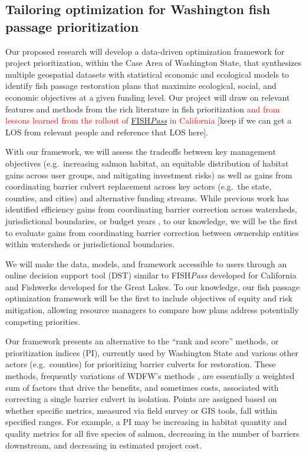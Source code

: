 \documentclass[12pt]{elsarticle}
\begin{document}
\subsection*{Tailoring optimization for Washington fish passage prioritization}

Our proposed research will develop a data-driven optimization framework for project prioritization, within the Case Area of Washington State, that synthesizes multiple geospatial datasets with statistical economic and ecological models to identify fish passage restoration plans that maximize ecological, social, and economic objectives at a given funding level. Our project will draw on relevant features and methods from the rich literature in fish prioritization \textcolor{red}{and from lessons learned from the rollout of \href{https://fishpass.psmfc.org}{FISH\emph{Pass}} in California} [keep if we can get a LOS from relevant people and reference that LOS here].


With our framework, we will assess the tradeoffs between key management objectives (e.g.\ increasing salmon habitat, an equitable distribution of habitat gains across user groups, and mitigating investment risks) as well as gains from coordinating barrier culvert replacement across key actors (e.g.\ the state, counties, and cities) and alternative funding streams. While previous work has identified efficiency gains from coordinating barrier correction across watersheds, jurisdictional boundaries, or budget years \citep{neeson_enhancing_2015,milt_local-scale_2017}, to our knowledge, we will be the first to evaluate gains from coordinating barrier correction between ownership entities within watersheds or jurisdictional boundaries.


We will make the data, models, and framework accessible to users through an online decision support tool (DST) similar to FISH\emph{Pass} developed for California and Fishwerks developed for the Great Lakes. To our knowledge, our fish passage optimization framework will be the first to include objectives of equity and risk mitigation, allowing resource managers to compare how plans address potentially competing priorities. 

Our framework presents an alternative to the ``rank and score'' methods, or prioritization indices (PI), currently used by Washington State and various other actors (e.g.\ counties) for prioritizing barrier culverts for restoration. These methods, frequently variations of WDFW's methods \citep{noauthor_fish_2019}, are essentially a weighted sum of factors that drive the benefits, and sometimes costs, associated with correcting a single barrier culvert in isolation. Points are assigned based on whether specific metrics, measured via field survey or GIS tools, fall within specified ranges. For example, a PI may be increasing in habitat quantity and quality metrics for all five species of salmon, decreasing in the number of barriers downstream, and decreasing in estimated project cost. 
\end{document}
